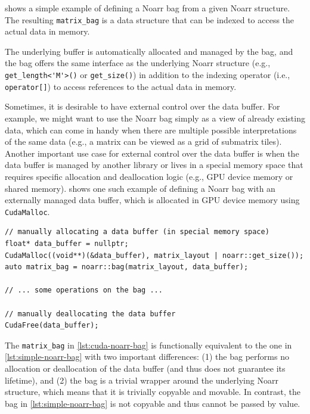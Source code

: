  shows a simple example of defining a Noarr bag from a given Noarr structure. The resulting \lstinline{matrix_bag} is a data structure that can be indexed to access the actual data in memory.

The underlying buffer is automatically allocated and managed by the bag, and the bag offers the same interface as the underlying Noarr structure (e.g., \lstinline{get_length<'M'>()} or \lstinline{get_size()}) in addition to the indexing operator (i.e., \lstinline{operator[]}) to access references to the actual data in memory.

Sometimes, it is desirable to have external control over the data buffer. For example, we might want to use the Noarr bag simply as a view of already existing data, which can come in handy when there are multiple possible interpretations of the same data (e.g., a matrix can be viewed as a grid of submatrix tiles).
Another important use case for external control over the data buffer is when the data buffer is managed by another library or lives in a special memory space that requires specific allocation and deallocation logic (e.g., GPU device memory or shared memory).  shows one such example of defining a Noarr bag with an externally managed data buffer, which is allocated in GPU device memory using \lstinline{CudaMalloc}.

\begin{lstlisting}[style=C++, caption={Defining a Noarr bag with an externally managed data buffer}, label={lst:cuda-noarr-bag}, basicstyle=\ttfamily\scriptsize]
// manually allocating a data buffer (in special memory space)
float* data_buffer = nullptr;
CudaMalloc((void**)(&data_buffer), matrix_layout | noarr::get_size());
auto matrix_bag = noarr::bag(matrix_layout, data_buffer);

// ... some operations on the bag ...

// manually deallocating the data buffer
CudaFree(data_buffer);
\end{lstlisting}

The \lstinline{matrix_bag} in \cref{lst:cuda-noarr-bag} is functionally equivalent to the one in \cref{lst:simple-noarr-bag} with two important differences: (1) the bag performs no allocation or deallocation of the data buffer (and thus does not guarantee its lifetime), and (2) the bag is a trivial wrapper around the underlying Noarr structure, which means that it is trivially copyable and movable. In contrast, the bag in \cref{lst:simple-noarr-bag} is not copyable and thus cannot be passed by value.

